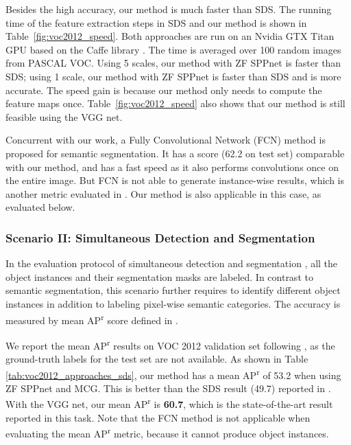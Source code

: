 \documentclass[10pt,twocolumn,letterpaper]{article}
\begin{document}
Besides the high accuracy, our method is much faster than SDS. The running time of the feature extraction steps in SDS and our method is shown in Table~\ref{fig:voc2012_speed}. Both approaches are run on an Nvidia GTX Titan GPU based on the Caffe library \cite{jia2014caffe}. The time is averaged over 100 random images from PASCAL VOC. Using 5 scales, our method with ZF SPPnet is  faster than SDS; using 1 scale, our method with ZF SPPnet is  faster than SDS and is more accurate. The speed gain is because our method only needs to compute the feature maps once. Table~\ref{fig:voc2012_speed} also shows that our method is still feasible using the VGG net.

Concurrent with our work, a Fully Convolutional Network (FCN) method \cite{Long2014} is proposed for semantic segmentation. It has a score (62.2 on test set) comparable with our method, and has a fast speed as it also performs convolutions once on the entire image. But FCN is not able to generate instance-wise results, which is another metric evaluated in \cite{hariharan2014simultaneous}. Our method is also applicable in this case, as evaluated below.

\subsubsection*{Scenario II: Simultaneous Detection and Segmentation}

In the evaluation protocol of simultaneous detection and segmentation \cite{hariharan2014simultaneous}, all the object instances and their segmentation masks are labeled. In contrast to semantic segmentation, this scenario further requires to identify different object instances in addition to labeling pixel-wise semantic categories. The accuracy is measured by mean AP\textsuperscript{r} score defined in \cite{hariharan2014simultaneous}.

We report the mean AP\textsuperscript{r} results on VOC 2012 validation set following \cite{hariharan2014simultaneous}, as the ground-truth labels for the test set are not available.
As shown in Table \ref{tab:voc2012_approaches_sds}, our method has a mean AP\textsuperscript{r} of 53.2 when using ZF SPPnet and MCG. This is better than the SDS result (49.7) reported in \cite{hariharan2014simultaneous}. With the VGG net, our mean AP\textsuperscript{r} is \textbf{60.7}, which is the state-of-the-art result reported in this task. Note that the FCN method \cite{Long2014} is not applicable when evaluating the mean AP\textsuperscript{r} metric, because it cannot produce object instances.
\end{document}
